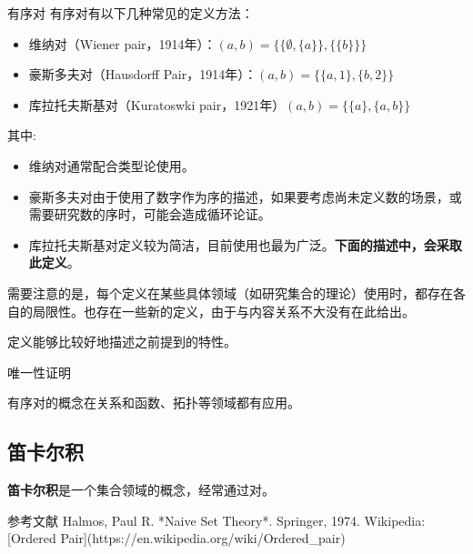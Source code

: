 \begin{definition}{有序对}
有序对有以下几种常见的定义方法：
\begin{itemize}
\item 维纳对（Wiener pair，1914年）：$(a, b) = \{\{\emptyset,\{ a\}\}, \{\{b\}\}\} $
\item 豪斯多夫对（Hausdorff Pair，1914年）：$ (a, b) = \{\{a, 1\}, \{b, 2\}\} $
\item 库拉托夫斯基对（Kuratoswki pair，1921年）$(a, b) = \{\{a\}, \{a, b\}\}$
\end{itemize}
\end{definition}
其中:
\begin{itemize}
\item 维纳对通常配合类型论使用。
\item 豪斯多夫对由于使用了数字作为序的描述，如果要考虑尚未定义数的场景，或需要研究数的序时，可能会造成循环论证。
\item 库拉托夫斯基对定义较为简洁，目前使用也最为广泛。\textbf{下面的描述中，会采取此定义}。
\end{itemize}

需要注意的是，每个定义在某些具体领域（如研究集合的理论）使用时，都存在各自的局限性。也存在一些新的定义，由于与内容关系不大没有在此给出。

定义能够比较好地描述之前提到的特性。
\begin{example}{唯一性证明}

\end{example}


有序对的概念在关系和函数、拓扑等领域都有应用。


\subsection{笛卡尔积}

\textbf{笛卡尔积}是一个集合领域的概念，经常通过对。

参考文献
Halmos, Paul R. *Naive Set Theory*. Springer, 1974.
Wikipedia: [Ordered Pair](https://en.wikipedia.org/wiki/Ordered_pair)